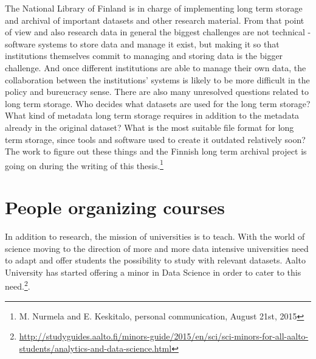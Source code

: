 The National Library of Finland is in charge of implementing long term storage
and archival of important datasets and other research material. From that point
of view and also research data in general the biggest challenges are not
technical - software systems to store data and manage it exist, but making it
so that institutions themselves commit to managing and storing data is the
bigger challenge. And once different institutions are able to manage their own
data, the collaboration between the institutions' systems is likely to be
more difficult in the policy and bureucracy sense. There are also many
unresolved questions related to long term storage. Who decides what datasets
are used for the long term storage? What kind of metadata long term storage
requires in addition to the metadata already in the original dataset? What
is the most suitable file format for long term storage, since tools and
software used to create it outdated relatively soon? The work
to figure out these things and the Finnish long term archival project is going
on during the writing of this thesis.\footnote{M. Nurmela and E. Keskitalo, personal communication, August 21st, 2015}

\section{People organizing courses}

In addition to research, the mission of universities is to teach. With the
world of science moving to the direction of more and more data intensive
universities need to adapt and offer students the possibility to study with
relevant datasets. Aalto University has started offering a minor in Data
Science in order to cater to this need.\footnote{\url{http://studyguides.aalto.fi/minors-guide/2015/en/sci/sci-minors-for-all-aalto-students/analytics-and-data-science.html}}.

